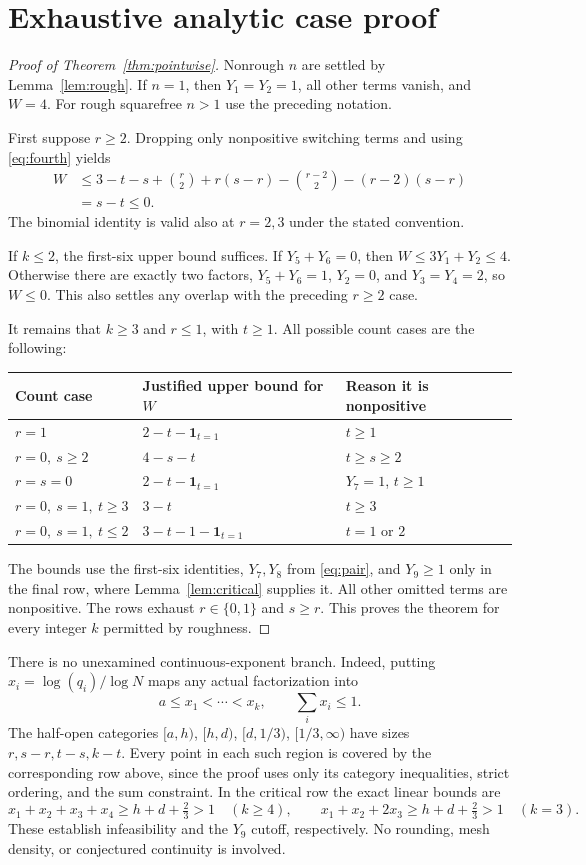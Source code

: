 \documentclass[11pt]{article}
\newcommand{\ind}{\mathbf 1}
\begin{document}
\section{Exhaustive analytic case proof}
\begin{proof}[Proof of Theorem~\ref{thm:pointwise}]
Nonrough $n$ are settled by Lemma~\ref{lem:rough}. If $n=1$, then
$Y_1=Y_2=1$, all other terms vanish, and $W=4$.
For rough squarefree $n>1$ use the preceding notation.

First suppose $r\ge2$. Dropping only nonpositive switching terms and
using \eqref{eq:fourth} yields
\begin{align*}
 W&\le3-t-s+\binom r2+r(s-r)
              -\binom{r-2}{2}-(r-2)(s-r)\\
  &=s-t\le0.
\end{align*}
The binomial identity is valid also at $r=2,3$ under the stated convention.

If $k\le2$, the first-six upper bound suffices. If $Y_5+Y_6=0$, then
$W\le3Y_1+Y_2\le4$. Otherwise there are exactly two factors,
$Y_5+Y_6=1$, $Y_2=0$, and $Y_3=Y_4=2$, so $W\le0$.
This also settles any overlap with the preceding $r\ge2$ case.

It remains that $k\ge3$ and $r\le1$, with $t\ge1$.
All possible count cases are the following:
\begin{center}
\begin{tabular}{lll}
\toprule
Count case & Justified upper bound for $W$ & Reason it is nonpositive\\
\midrule
$r=1$ & $2-t-\ind_{t=1}$ & $t\ge1$\\
$r=0,\ s\ge2$ & $4-s-t$ & $t\ge s\ge2$\\
$r=s=0$ & $2-t-\ind_{t=1}$ & $Y_7=1$, $t\ge1$\\
$r=0,\ s=1,\ t\ge3$ & $3-t$ & $t\ge3$\\
$r=0,\ s=1,\ t\le2$ & $3-t-1-\ind_{t=1}$ & $t=1$ or $2$\\
\bottomrule
\end{tabular}
\end{center}
The bounds use the first-six identities, $Y_7,Y_8$ from
\eqref{eq:pair}, and $Y_9\ge1$ only in the final row, where
Lemma~\ref{lem:critical} supplies it. All other omitted terms are
nonpositive. The rows exhaust $r\in\{0,1\}$ and $s\ge r$.
This proves the theorem for every integer $k$ permitted by roughness.
\end{proof}

There is no unexamined continuous-exponent branch. Indeed, putting
$x_i=\log(q_i)/\log N$ maps any actual factorization into
\[
 a\le x_1<\cdots<x_k,\qquad \sum_i x_i\le1.
\]
The half-open categories $[a,h)$, $[h,d)$, $[d,1/3)$, $[1/3,\infty)$
have sizes $r,s-r,t-s,k-t$. Every point in each such region is covered
by the corresponding row above, since the proof uses only its category
inequalities, strict ordering, and the sum constraint. In the critical
row the exact linear bounds are
\[
 x_1+x_2+x_3+x_4\ge h+d+\tfrac23>1\quad(k\ge4),\qquad
 x_1+x_2+2x_3\ge h+d+\tfrac23>1\quad(k=3).
\]
These establish infeasibility and the $Y_9$ cutoff, respectively.
No rounding, mesh density, or conjectured continuity is involved.
\end{document}
